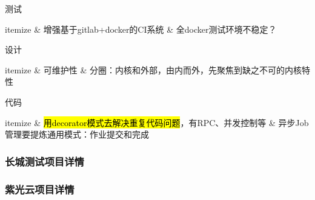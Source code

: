 测试
\begin{myeasylist}{itemize}
& 增强基于gitlab+docker的CI系统
& 全docker测试环境不稳定？
\end{myeasylist}

设计
\begin{myeasylist}{itemize}
& 可维护性
& 分圈：内核和外部，由内而外，先聚焦到缺之不可的内核特性
\end{myeasylist}

代码
\begin{myeasylist}{itemize}
& \hl{用decorator模式去解决重复代码问题}，有RPC、并发控制等
& 异步Job管理要提炼通用模式：作业提交和完成
\end{myeasylist}

\subsubsection{长城测试项目详情}

\subsubsection{紫光云项目详情}


